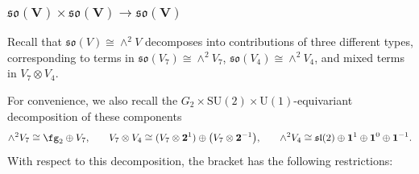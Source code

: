 \documentclass[pdftex]{sigma}
\numberwithin{equation}{section}
\theoremstyle{definition}
\def\lie#1{\ensuremath{\mathfrak{#1}}}
\def\U{\ensuremath{\mathrm{U}}}
\def\SU{\ensuremath{\mathrm{SU}}}
\begin{document}
\subsubsection[so(V) times so(V) longrightarrow so(V)]{$\boldsymbol{\lie{so}(V) \times \lie{so}(V) \longrightarrow \lie{so}(V)}$}
Recall that $\lie{so}(V) \cong \wedge^2 V$ decomposes into contributions of three different types, corresponding to terms in $\lie{so}(V_7) \cong \wedge^2 V_7$, $\lie{so}(V_4) \cong \wedge^2 V_4$, and mixed terms in $V_7 \otimes V_4$.

For convenience, we also recall the $G_2 \times \SU(2) \times \U(1)$-equivariant decomposition of these components
\begin{gather*}
 \wedge^2 V_7 \cong \fg_2 \oplus V_7 ,\qquad\!
 V_7 \otimes V_4 \cong (V_7 \otimes \textbf{2}^1) \oplus \big(V_7 \otimes \textbf{2}^{-1}\big) ,\qquad\!
 \wedge^2 V_4 \cong \lie{sl}(2) \oplus \textbf{1}^1 \oplus \textbf{1}^0 \oplus \textbf{1}^{-1}.
\end{gather*}
With respect to this decomposition, the bracket has the following restrictions:
\end{document}
